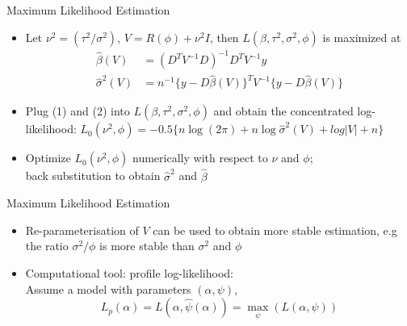 \documentclass{beamer}
\begin{document}
\begin{frame}{Maximum Likelihood Estimation}

	\begin{itemize}
	   \item Let $\nu^2 = ({\tau^2} /{\sigma^2})$, $V = R(\phi) + \nu^2 I$, then $L(\beta, \tau^2, \sigma^2, \phi)$ is maximized at 
		\begin{align}
		\hat{\beta}(V) &= (D^T V^{-1}D)^{-1}D^TV^{-1}y \\
		\hat{\sigma}^2(V) &= n^{-1} \{y - D\hat{\beta}(V)\}^T V^{-1}\{y - D\hat{\beta}(V)\} 
		\end{align}
		\item Plug (1) and (2) into $L(\beta, \tau^2, \sigma^2, \phi)$ and obtain  the {\color{blue}concentrated log-likelihood}: 
		$L_0(\nu^2, \phi) = -0.5 \{n \log (2 \pi) + n \log \hat{\sigma}^2(V) +  log |V|+ n \}$
		\item Optimize $L_0(\nu^2, \phi)$ numerically with respect to $\nu$ and $\phi$; \\ back substitution to obtain $\hat{\sigma}^2$ and $\hat{\beta}$
	\end{itemize}
\end{frame}


\begin{frame}{Maximum Likelihood Estimation}

	\begin{itemize}
\item Re-parameterisation of $V$ can be used to obtain more stable estimation, e.g  the ratio $\sigma^2 / \phi$ is more stable than $\sigma^2$ and $\phi$
		\item  Computational tool:  {\color{blue}profile log-likelihood}: \\
		Assume a model with parameters $(\alpha, \psi)$, 
		$$L_p(\alpha) = L(\alpha, \hat{\psi}(\alpha))  = \max_{\psi}(L(\alpha, \psi))$$  %
	\end{itemize}
\end{frame}
\end{document}
